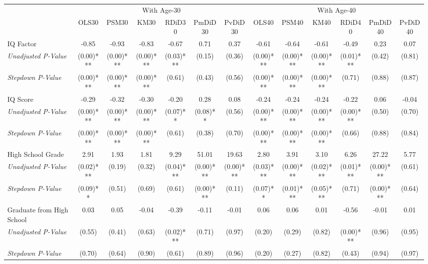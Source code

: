 \begin{tabular}{l c c c c c c c c c c c c}
\toprule
& \multicolumn{6}{c}{With Age-30} & \multicolumn{6}{c}{With Age-40} \\\cmidrule(lr){2-7} \cmidrule(lr){8-13}
 & OLS30 & PSM30 & KM30 & RDiD30 & PmDiD30 & PvDiD30 & OLS40 & PSM40 & KM40 & RDiD40 & PmDiD40 & PvDiD40 \\
\midrule
IQ Factor & -0.85 & -0.93 & -0.83 & -0.67 & 0.71 & 0.37 & -0.61 & -0.64 & -0.61 & -0.49 & 0.23 & 0.07 \\
\quad \textit{Unadjusted P-Value} & (0.00)*** & (0.00)*** & (0.00)*** & (0.03)*** & (0.15) & (0.36) & (0.00)*** & (0.00)*** & (0.00)*** & (0.01)*** & (0.42) & (0.81) \\
\quad \textit{Stepdown P-Value} & (0.00)*** & (0.00)*** & (0.00)*** & (0.61) & (0.43) & (0.56) & (0.00)*** & (0.00)*** & (0.00)*** & (0.71) & (0.88) & (0.87) \\
IQ Score & -0.29 & -0.32 & -0.30 & -0.20 & 0.28 & 0.08 & -0.24 & -0.24 & -0.24 & -0.22 & 0.06 & -0.04 \\
\quad \textit{Unadjusted P-Value} & (0.00)*** & (0.00)*** & (0.00)*** & (0.07)** & (0.08)** & (0.56) & (0.00)*** & (0.00)*** & (0.00)*** & (0.00)*** & (0.50) & (0.70) \\
\quad \textit{Stepdown P-Value} & (0.00)*** & (0.00)*** & (0.00)*** & (0.61) & (0.38) & (0.70) & (0.00)*** & (0.00)*** & (0.00)*** & (0.66) & (0.88) & (0.84) \\
High School Grade & 2.91 & 1.93 & 1.81 & 9.29 & 51.01 & 19.63 & 2.80 & 3.91 & 3.10 & 6.26 & 27.22 & 5.77 \\
\quad \textit{Unadjusted P-Value} & (0.02)*** & (0.19) & (0.32) & (0.04)*** & (0.00)*** & (0.00)*** & (0.03)*** & (0.00)*** & (0.02)*** & (0.01)*** & (0.00)*** & (0.61) \\
\quad \textit{Stepdown P-Value} & (0.09)** & (0.51) & (0.69) & (0.61) & (0.00)*** & (0.11) & (0.07)** & (0.01)*** & (0.05)*** & (0.71) & (0.00)*** & (0.64) \\
Graduate from High School & 0.03 & 0.05 & -0.04 & -0.39 & -0.11 & -0.01 & 0.06 & 0.06 & 0.01 & -0.56 & -0.01 & 0.01 \\
\quad \textit{Unadjusted P-Value} & (0.55) & (0.41) & (0.63) & (0.02)*** & (0.71) & (0.97) & (0.20) & (0.29) & (0.82) & (0.00)*** & (0.96) & (0.95) \\
\quad \textit{Stepdown P-Value} & (0.70) & (0.64) & (0.90) & (0.61) & (0.89) & (0.96) & (0.20) & (0.27) & (0.82) & (0.43) & (0.94) & (0.97) \\

\end{tabular}
